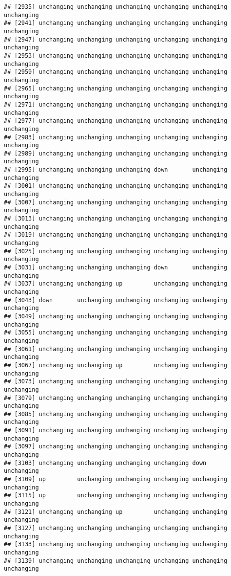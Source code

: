 \documentclass[]{article}
\begin{document}
\begin{verbatim}
## [2935] unchanging unchanging unchanging unchanging unchanging unchanging
## [2941] unchanging unchanging unchanging unchanging unchanging unchanging
## [2947] unchanging unchanging unchanging unchanging unchanging unchanging
## [2953] unchanging unchanging unchanging unchanging unchanging unchanging
## [2959] unchanging unchanging unchanging unchanging unchanging unchanging
## [2965] unchanging unchanging unchanging unchanging unchanging unchanging
## [2971] unchanging unchanging unchanging unchanging unchanging unchanging
## [2977] unchanging unchanging unchanging unchanging unchanging unchanging
## [2983] unchanging unchanging unchanging unchanging unchanging unchanging
## [2989] unchanging unchanging unchanging unchanging unchanging unchanging
## [2995] unchanging unchanging unchanging down       unchanging unchanging
## [3001] unchanging unchanging unchanging unchanging unchanging unchanging
## [3007] unchanging unchanging unchanging unchanging unchanging unchanging
## [3013] unchanging unchanging unchanging unchanging unchanging unchanging
## [3019] unchanging unchanging unchanging unchanging unchanging unchanging
## [3025] unchanging unchanging unchanging unchanging unchanging unchanging
## [3031] unchanging unchanging unchanging down       unchanging unchanging
## [3037] unchanging unchanging up         unchanging unchanging unchanging
## [3043] down       unchanging unchanging unchanging unchanging unchanging
## [3049] unchanging unchanging unchanging unchanging unchanging unchanging
## [3055] unchanging unchanging unchanging unchanging unchanging unchanging
## [3061] unchanging unchanging unchanging unchanging unchanging unchanging
## [3067] unchanging unchanging up         unchanging unchanging unchanging
## [3073] unchanging unchanging unchanging unchanging unchanging unchanging
## [3079] unchanging unchanging unchanging unchanging unchanging unchanging
## [3085] unchanging unchanging unchanging unchanging unchanging unchanging
## [3091] unchanging unchanging unchanging unchanging unchanging unchanging
## [3097] unchanging unchanging unchanging unchanging unchanging unchanging
## [3103] unchanging unchanging unchanging unchanging down       unchanging
## [3109] up         unchanging unchanging unchanging unchanging unchanging
## [3115] up         unchanging unchanging unchanging unchanging unchanging
## [3121] unchanging unchanging up         unchanging unchanging unchanging
## [3127] unchanging unchanging unchanging unchanging unchanging unchanging
## [3133] unchanging unchanging unchanging unchanging unchanging unchanging
## [3139] unchanging unchanging unchanging unchanging unchanging unchanging

\end{verbatim}
\end{document}

